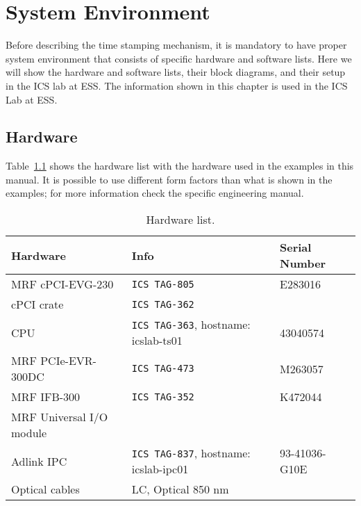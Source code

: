 \documentclass[11pt
  , a4paper
  , article
  , oneside
  , showtrims
]{memoir}
\begin{document}
\clearpage

\chapter{System Environment}
Before describing the time stamping mechanism, it is mandatory to have proper system environment that consists of specific hardware and software lists. Here we will show the hardware and software lists, their block diagrams, and their setup in the ICS lab at ESS. The information shown in this chapter is used in the ICS Lab at ESS.

\section{Hardware}
Table~\ref{table:hwlist} shows the hardware list with the hardware used in the examples in this manual. It is possible to use different form factors than what is shown in the examples; for more information check the specific engineering manual.
\begin{table}[!htb]
  \centering
  \begin{tabular}{l|l|l}
    \toprule
    Hardware                 & Info                                         & Serial Number \\\midrule
    MRF cPCI-EVG-230         & \texttt{ICS TAG-805}                         & E283016       \\\midrule
    cPCI crate               & \texttt{ICS TAG-362}                         &               \\\midrule
    CPU                      & \texttt{ICS TAG-363}, hostname: icslab-ts01  & 43040574      \\\midrule
    MRF PCIe-EVR-300DC       & \texttt{ICS TAG-473}                         & M263057       \\\midrule
    MRF IFB-300              & \texttt{ICS TAG-352}                         & K472044       \\\midrule
    MRF Universal I/O module &                                              &               \\\midrule
    Adlink IPC               & \texttt{ICS TAG-837}, hostname: icslab-ipc01 & 93-41036-G10E \\\midrule
    Optical cables           & LC, Optical 850 nm                           &               \\\bottomrule
  \end{tabular}
  \caption[]{Hardware list.}
  \label{table:hwlist}
\end{table}
\end{document}
